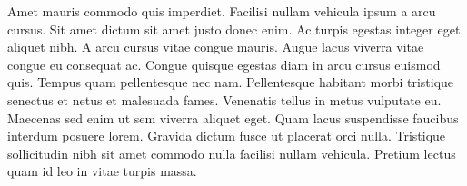 \documentclass[letterpaper,\myfontsize]{article}
\newcommand*\mytref[7]{\bibitem{#1}#2 ``#3.'' \textit{#4} \textbf{#5}, \textit{#6}, #7.} %
\newcommand*\myzref[8]{\bibitem{#1}#2 ``#3.'' \textit{#4} \textbf{#5}, \textit{#6}(#7), #8.} %
\begin{document}
Amet mauris commodo quis imperdiet. Facilisi nullam vehicula ipsum a arcu cursus. Sit amet dictum sit amet justo donec enim. Ac turpis egestas integer eget aliquet nibh. A arcu cursus vitae congue mauris. Augue lacus viverra vitae congue eu consequat ac. Congue quisque egestas diam in arcu cursus euismod quis. Tempus quam pellentesque nec nam. Pellentesque habitant morbi tristique senectus et netus et malesuada fames. Venenatis tellus in metus vulputate eu. Maecenas sed enim ut sem viverra aliquet eget. Quam lacus suspendisse faucibus interdum posuere lorem. Gravida dictum fusce ut placerat orci nulla. Tristique sollicitudin nibh sit amet commodo nulla facilisi nullam vehicula. Pretium lectus quam id leo in vitae turpis massa.

\printbibliography

\end{document}
